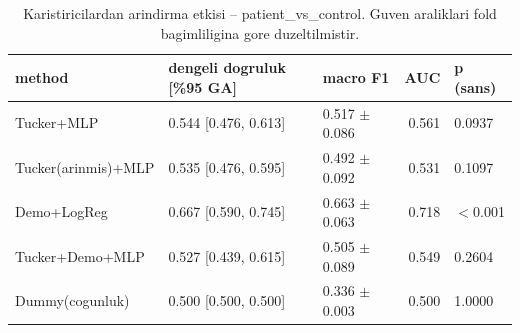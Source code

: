 \begin{table}[htbp]
  \centering
  \caption{Karistiricilardan arindirma etkisi -- patient\_vs\_control. Guven araliklari fold bagimliligina gore duzeltilmistir.}
  \label{tab:deconf_patient_vs_control}
  \small
  \begin{tabular}{lllrl}
    \toprule
    method & dengeli dogruluk [\%95 GA] & macro F1 & AUC & p (sans) \\
    \midrule
    Tucker+MLP & 0.544 [0.476, 0.613] & 0.517 $\pm$ 0.086 & 0.561 & 0.0937 \\
    Tucker(arinmis)+MLP & 0.535 [0.476, 0.595] & 0.492 $\pm$ 0.092 & 0.531 & 0.1097 \\
    Demo+LogReg & 0.667 [0.590, 0.745] & 0.663 $\pm$ 0.063 & 0.718 & $<$0.001 \\
    Tucker+Demo+MLP & 0.527 [0.439, 0.615] & 0.505 $\pm$ 0.089 & 0.549 & 0.2604 \\
    Dummy(cogunluk) & 0.500 [0.500, 0.500] & 0.336 $\pm$ 0.003 & 0.500 & 1.0000 \\
    \bottomrule
  \end{tabular}
\end{table}
